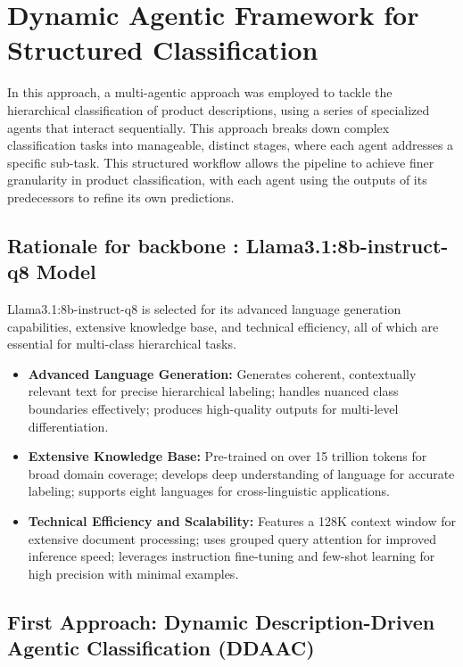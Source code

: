 \documentclass[9pt,a4paper,twoside]{rho-class/rho}
\begin{document}
\section{Dynamic Agentic Framework for Structured Classification}

In this approach, a multi-agentic approach was employed to tackle the hierarchical classification of product descriptions, using a series of specialized agents that interact sequentially. This approach breaks down complex classification tasks into manageable, distinct stages, where each agent addresses a specific sub-task. This structured workflow allows the pipeline to achieve finer granularity in product classification, with each agent using the outputs of its predecessors to refine its own predictions.



    \subsection{Rationale for backbone : Llama3.1:8b-instruct-q8 Model}

Llama3.1:8b-instruct-q8 is selected for its advanced language generation capabilities, extensive knowledge base, and technical efficiency, all of which are essential for multi-class hierarchical tasks.

\begin{itemize}
    \item \textbf{Advanced Language Generation:} Generates coherent, contextually relevant text for precise hierarchical labeling; handles nuanced class boundaries effectively; produces high-quality outputs for multi-level differentiation.
    
    \item \textbf{Extensive Knowledge Base:} Pre-trained on over 15 trillion tokens for broad domain coverage; develops deep understanding of language for accurate labeling; supports eight languages for cross-linguistic applications.

    \item \textbf{Technical Efficiency and Scalability:} Features a 128K context window for extensive document processing; uses grouped query attention for improved inference speed; leverages instruction fine-tuning and few-shot learning for high precision with minimal examples.
\end{itemize}

\subsection{First Approach: Dynamic Description-Driven Agentic Classification (DDAAC)}
\end{document}
